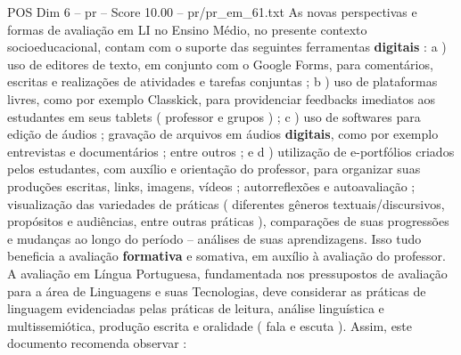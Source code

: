 \begin{textsample}{POS Dim 6 – pr – Score 10.00 – pr/pr\_em\_61.txt}
As novas perspectivas e formas de avaliação em LI no Ensino Médio, no presente contexto socioeducacional, contam com o suporte das seguintes ferramentas \textbf{digitais} : a ) uso de editores de texto, em conjunto com o Google Forms, para comentários, escritas e realizações de atividades e tarefas conjuntas ; b ) uso de plataformas livres, como por exemplo Classkick, para providenciar feedbacks imediatos aos estudantes em seus tablets ( professor e grupos ) ; c ) uso de softwares para edição de áudios ; gravação de arquivos em áudios \textbf{digitais}, como por exemplo entrevistas e documentários ; entre outros ; e d ) utilização de e-portfólios criados pelos estudantes, com auxílio e orientação do professor, para organizar suas produções escritas, links, imagens, vídeos ; autorreflexões e autoavaliação ; visualização das variedades de práticas ( diferentes gêneros textuais/discursivos, propósitos e audiências, entre outras práticas ), comparações de suas progressões e mudanças ao longo do período – análises de suas aprendizagens.
Isso tudo beneficia a avaliação \textbf{formativa} e somativa, em auxílio à avaliação do professor.
A avaliação em Língua Portuguesa, fundamentada nos pressupostos de avaliação para a área de Linguagens e suas Tecnologias, deve considerar as práticas de linguagem evidenciadas pelas práticas de leitura, análise linguística e multissemiótica, produção escrita e oralidade ( fala e escuta ).
Assim, este documento recomenda observar :

\end{textsample}
